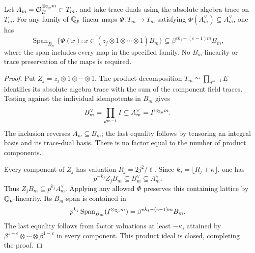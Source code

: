 \begin{proposition}
\label{prop:gs-dual-pilot-upper}
Let $A_m=\mathcal O_E^{\otimes_{\mathbb Z_p}m}\subset T_m$, and take trace duals
using the absolute algebra trace on $T_m$. For any family of
$\mathbb Q_p$-linear maps $\Phi:T_m\to T_m$ satisfying
$\Phi(A_m^\vee)\subseteq A_m^\vee$, one has
\begin{equation}\label{eq:gs-dual-pilot-upper}
 \overline{\operatorname{Span}_{B_m}
       \{\Phi(x):x\in(z_j\otimes1\otimes\cdots\otimes1)B_m\}}
 \subseteq\beta^{e k_j-(e-1)m}B_m ,
\end{equation}
where the span includes every map in the specified family.
No $B_m$-linearity or trace preservation of the maps is required.
\end{proposition}
\begin{proof}
Put $Z_j=z_j\otimes1\otimes\cdots\otimes1$. The product decomposition
$T_m\simeq\prod_{d^{m-1}}E$ identifies its absolute algebra trace
with the sum of the component field traces. Testing against the
individual idempotents in $B_m$ gives
\[
 B_m^\vee=\prod_{d^{m-1}}I
       \subseteq A_m^\vee=I^{\otimes_{\mathbb Z_p}m}.
\]
The inclusion reverses $A_m\subseteq B_m$; the last equality follows
by tensoring an integral basis and its trace-dual basis. There is no
factor equal to the number of product components.

Every component of $Z_j$ has valuation $R_j=2j^2/\ell$.
Since $k_j=\lfloor R_j+\kappa\rfloor$, one has
\[
 p^{-k_j}Z_jB_m\subseteq B_m^\vee\subseteq A_m^\vee.
\]
Thus $Z_jB_m\subseteq p^{k_j}A_m^\vee$. Applying any allowed $\Phi$
preserves this containing lattice by $\mathbb Q_p$-linearity. Its $B_m$-span
is contained in
\[
 p^{k_j}\operatorname{Span}_{B_m}(I^{\otimes_{\mathbb Z_p}m})
       =\beta^{e k_j-(e-1)m}B_m.
\]
The last equality follows from factor valuations at least $-\kappa$,
attained by $\beta^{1-e}\otimes\cdots\otimes\beta^{1-e}$ in every
component. This product ideal is closed, completing the proof.
\end{proof}

